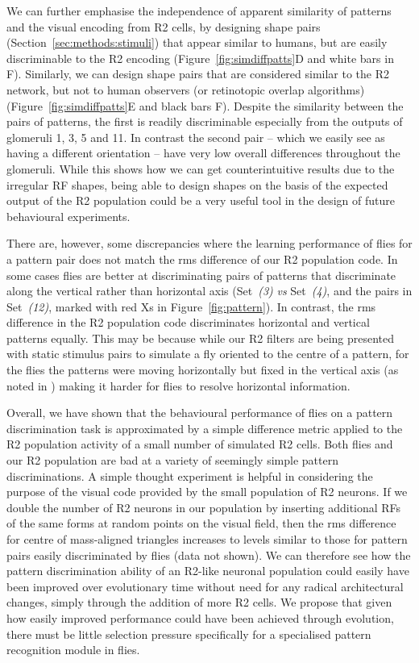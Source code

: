 \documentclass[10pt]{article}
\begin{document}
We can further emphasise the independence of apparent similarity of patterns and the visual encoding from R2 cells, by designing shape pairs (Section~\ref{sec:methods:stimuli}) that appear similar to humans, but are easily discriminable to the R2 encoding (Figure~\ref{fig:simdiffpatts}D and white bars in F). Similarly, we can design shape pairs that are considered similar to the R2 network, but not to human observers (or retinotopic overlap algorithms) (Figure~\ref{fig:simdiffpatts}E and black bars F). Despite the similarity between the pairs of patterns, the first is readily discriminable especially from the outputs of glomeruli 1, 3, 5 and 11. In contrast the second pair -- which we easily see as having a different orientation -- have very low overall differences throughout the glomeruli. While this shows how we can get counterintuitive results due to the irregular RF shapes, being able to design shapes on the basis of the expected output of the R2 population could be a very useful tool in the design of future behavioural experiments.

There are, however, some discrepancies where the learning performance of flies for a pattern pair does not match the \ac{rms} difference of our R2 population code. In some cases flies are better at discriminating pairs of patterns that discriminate along the vertical rather than horizontal axis (Set~\emph{(3)} \emph{vs} Set~\emph{(4)}, and the pairs in Set~\emph{(12)}, marked with red Xs in Figure~\ref{fig:pattern}). In contrast, the \ac{rms} difference in the R2 population code discriminates horizontal and vertical patterns equally. This may be because while our R2 filters are being presented with static stimulus pairs to simulate a fly oriented to the centre of a pattern, for the flies the patterns were moving horizontally but fixed in the vertical axis (as noted in \cite{Ernst1999}) making it harder for flies to resolve horizontal information.

Overall, we have shown that the behavioural performance of flies on a pattern discrimination task is approximated by a simple difference metric applied to the R2 population activity of a small number of simulated R2 cells. Both flies and our R2 population are bad at a variety of seemingly simple pattern discriminations. A simple thought experiment is helpful in considering the purpose of the visual code provided by the small population of R2 neurons. If we double the number of R2 neurons in our population by inserting additional RFs of the same forms at random points on the visual field, then the \ac{rms} difference for centre of mass-aligned triangles increases to levels similar to those for pattern pairs easily discriminated by flies (data not shown). We can therefore see how the pattern discrimination ability of an R2-like neuronal population could easily have been improved over evolutionary time without need for any radical architectural changes, simply through the addition of more R2 cells. We propose that given how easily improved performance could have been achieved through evolution, there must be little selection pressure specifically for a specialised pattern recognition module in flies.
\end{document}
